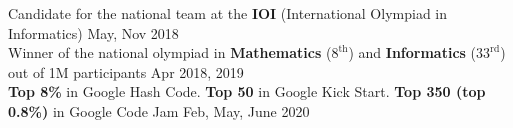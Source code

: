 
Candidate for the national team at the \textbf{IOI} (International Olympiad in Informatics) \hfill May, Nov 2018 \\
Winner of the national olympiad in \textbf{Mathematics} ($8^{\text{th}}$) and \textbf{Informatics} ($33^{\text{rd}}$) out of 1M participants \hfill Apr 2018, 2019 \\
\textbf{Top 8\%} in Google Hash Code. \textbf{Top 50} in Google Kick Start. \textbf{Top 350 (top 0.8\%)} in Google Code Jam \hfill Feb, May, June 2020

